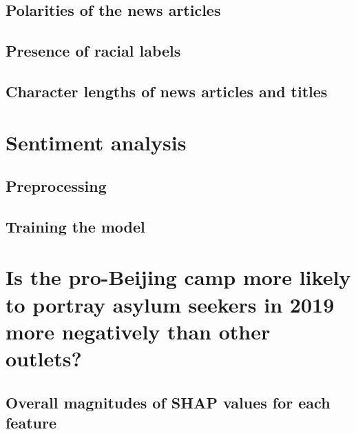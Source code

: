 \documentclass[a4paper, oneside]{report}
\begin{document}
\hypertarget{polarities-of-the-news-articles}{%
\subsection{Polarities of the news
articles}\label{polarities-of-the-news-articles}}

\hypertarget{presence-of-racial-labels}{%
\subsection{Presence of racial labels}\label{presence-of-racial-labels}}

\hypertarget{character-lengths-of-news-articles-and-titles}{%
\subsection{Character lengths of news articles and
titles}\label{character-lengths-of-news-articles-and-titles}}

\hypertarget{sentiment-analysis}{%
\section{Sentiment analysis}\label{sentiment-analysis}}

\hypertarget{preprocessing}{%
\subsection{Preprocessing}\label{preprocessing}}

\hypertarget{training-the-model}{%
\subsection{Training the model}\label{training-the-model}}

\hypertarget{is-the-pro-beijing-camp-more-likely-to-portray-asylum-seekers-in-2019-more-negatively-than-other-outlets}{%
\section{Is the pro-Beijing camp more likely to portray asylum seekers
in 2019 more negatively than other
outlets?}\label{is-the-pro-beijing-camp-more-likely-to-portray-asylum-seekers-in-2019-more-negatively-than-other-outlets}}

\hypertarget{overall-magnitudes-of-shap-values-for-each-feature}{%
\subsection{Overall magnitudes of SHAP values for each
feature}\label{overall-magnitudes-of-shap-values-for-each-feature}}
\end{document}
